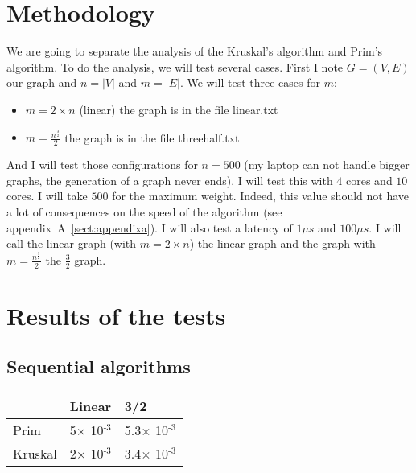 \documentclass[
10pt, %
a4paper, %
oneside, %
headinclude,footinclude, %
BCOR5mm, %
]{scrartcl}
\begin{document}

\newpage %


\section{Methodology}

We are going to separate the analysis of the Kruskal's algorithm and
Prim's algorithm. To do the analysis, we will test several
cases. First I note $G=(V, E)$ our graph and $n=|V|$ and $m=|E|$. We
will test three cases for $m$:
\begin{itemize}
\item $m=2\times n$ (linear) the graph is in the file linear.txt
\item $m=\frac{n^{\frac{3}{2}}}{2}$ the graph is in the file threehalf.txt
\end{itemize}

And I will test those configurations for $n=500$ (my
laptop can not handle bigger graphs, the generation of  a graph never ends).
I will test this with $4$ cores and $10$ cores. I will take $500$ for
the maximum weight. Indeed, this value should not have a lot of
consequences on the speed of the algorithm (see appendix~A~\ref{sect:appendixa}). I will also test a latency
of $1\mu s$ and $100\mu s$. I will call the linear graph (with
$m=2\times n$) the linear graph and the graph with $m =
\frac{n^{\frac{3}{2}}}{2}$ the $\frac{3}{2}$ graph.

\section{Results of the tests}

\subsection{Sequential algorithms}
\begin{center}
  \begin{tabular}{|l|l|l|}
    \hline
    & Linear & 3/2\\
    \hline    
    Prim & 5$\times$ 10\(^{\text{-3}}\) & 5.3$\times$
                                          10\(^{\text{-3}}\)\\
    \hline    
    Kruskal & 2$\times$ 10\(^{\text{-3}}\) & 3.4$\times$
                                             10\(^{\text{-3}}\)\\
    \hline    
  \end{tabular}
\end{center}
\end{document}
